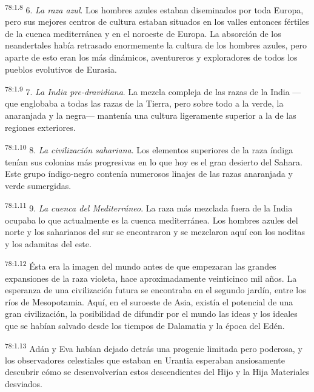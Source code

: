 \par
\textsuperscript{78:1.8} 6. \textit{La raza azul}. Los hombres azules estaban diseminados por toda Europa, pero sus mejores centros de cultura estaban situados en los valles entonces fértiles de la cuenca mediterránea y en el noroeste de Europa. La absorción de los neandertales había retrasado enormemente la cultura de los hombres azules, pero aparte de esto eran los más dinámicos, aventureros y exploradores de todos los pueblos evolutivos de Eurasia.

\par
\textsuperscript{78:1.9} 7. \textit{La India pre-dravidiana}. La mezcla compleja de las razas de la India ---que englobaba a todas las razas de la Tierra, pero sobre todo a la verde, la anaranjada y la negra--- mantenía una cultura ligeramente superior a la de las regiones exteriores.

\par
\textsuperscript{78:1.10} 8. \textit{La civilización sahariana}. Los elementos superiores de la raza índiga tenían sus colonias más progresivas en lo que hoy es el gran desierto del Sahara. Este grupo índigo-negro contenía numerosos linajes de las razas anaranjada y verde sumergidas.

\par
\textsuperscript{78:1.11} 9. \textit{La cuenca del Mediterráneo}. La raza más mezclada fuera de la India ocupaba lo que actualmente es la cuenca mediterránea. Los hombres azules del norte y los saharianos del sur se encontraron y se mezclaron aquí con los noditas y los adamitas del este.

\par
\textsuperscript{78:1.12} Ésta era la imagen del mundo antes de que empezaran las grandes expansiones de la raza violeta, hace aproximadamente veinticinco mil años. La esperanza de una civilización futura se encontraba en el segundo jardín, entre los ríos de Mesopotamia. Aquí, en el suroeste de Asia, existía el potencial de una gran civilización, la posibilidad de difundir por el mundo las ideas y los ideales que se habían salvado desde los tiempos de Dalamatia y la época del Edén.

\par
\textsuperscript{78:1.13} Adán y Eva habían dejado detrás una progenie limitada pero poderosa, y los observadores celestiales que estaban en Urantia esperaban ansiosamente descubrir cómo se desenvolverían estos descendientes del Hijo y la Hija Materiales desviados.

